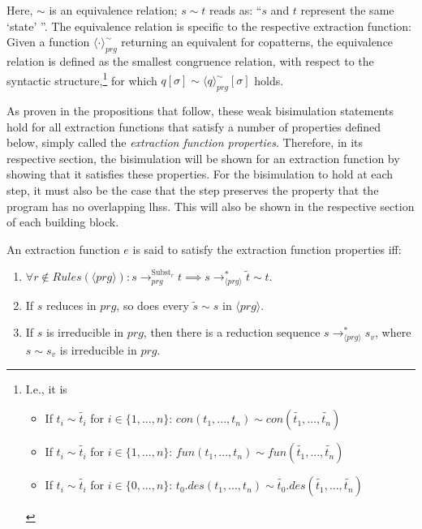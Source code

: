 Here, $\sim$ is an equivalence relation; $s \sim t$ reads as: ``$s$ and $t$ represent the same `state' ''. The equivalence relation is specific to the respective extraction function: Given a function $\langle \cdot \rangle^{\sim}_{prg}$ returning an equivalent for copatterns, the equivalence relation is defined as the smallest congruence relation, with respect to the syntactic structure,\footnote{I.e., it is
\begin{itemize}

\item If $t_i \sim \widetilde{t_i}$ for $i \in \{1, ..., n\}$: $con(t_1, ..., t_n) \sim con(\widetilde{t_1}, ..., \widetilde{t_n})$

\item If $t_i \sim \widetilde{t_i}$ for $i \in \{1, ..., n\}$: $fun(t_1, ..., t_n) \sim fun(\widetilde{t_1}, ..., \widetilde{t_n})$

\item If $t_i \sim \widetilde{t_i}$ for $i \in \{0, ..., n\}$: $t_0.des(t_1, ..., t_n) \sim \widetilde{t_0}.des(\widetilde{t_1}, ..., \widetilde{t_n})$ 

\end{itemize}} for which $q[\sigma] \sim \langle q \rangle^{\sim}_{prg}[\sigma]$ holds.

As proven in the propositions that follow, these weak bisimulation statements hold for all extraction functions that satisfy a number of properties defined below, simply called the \textit{extraction function properties}. Therefore, in its respective section, the bisimulation will be shown for an extraction function by showing that it satisfies these properties. For the bisimulation to hold at each step, it must also be the case that the step preserves the property that the program has no overlapping lhss. This will also be shown in the respective section of each building block.

\begin{definition}
An extraction function $e$ is said to satisfy the extraction function properties iff:

\begin{enumerate}
\item $\forall r \not\in Rules(\langle prg \rangle): s \longrightarrow^{\textrm{Subst}_r}_{prg} t \implies s \longrightarrow^*_{\langle prg \rangle} \widetilde{t} \sim t$.

\item If $s$ reduces in $prg$, so does every $\widetilde{s} \sim s$ in $\langle prg \rangle$.

\item If $s$ is irreducible in $prg$, then there is a reduction sequence $s \longrightarrow^*_{\langle prg \rangle} s_v$, where $s \sim s_v$ is irreducible in $prg$.

\end{enumerate}

\end{definition}

